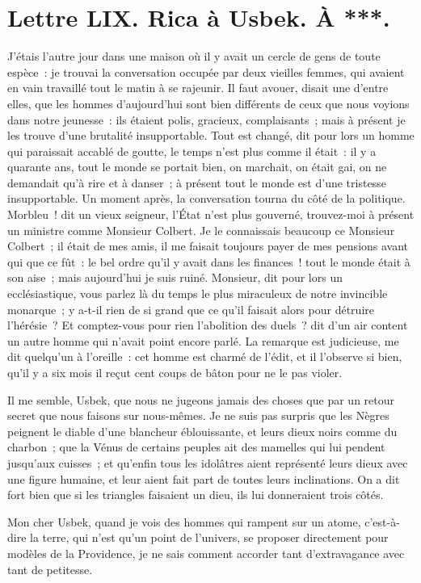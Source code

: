 \documentclass[french,twoside]{book} %
\newcommand{\dateline}[1]{\medskip{\RaggedLeft{#1}\par}\bigskip}
\begin{document}
\dateline{De Paris, le 10 de la lune de Saphar, 1714.}
\section[{Lettre LIX. Rica à Usbek. À ***.}]{Lettre LIX. Rica à Usbek. À ***.}\renewcommand{\leftmark}{Lettre LIX. Rica à Usbek. À ***.}

\noindent J’étais l’autre jour dans une maison où il y avait un cercle de gens de toute espèce : je trouvai la conversation occupée par deux vieilles femmes, qui avaient en vain travaillé tout le matin à se rajeunir. Il faut avouer, disait une d’entre elles, que les hommes d’aujourd’hui sont bien différents de ceux que nous voyions dans notre jeunesse : ils étaient polis, gracieux, complaisants ; mais à présent je les trouve d’une brutalité insupportable. Tout est changé, dit pour lors un homme qui paraissait accablé de goutte, le temps n’est plus comme il était : il y a quarante ans, tout le monde se portait bien, on marchait, on était gai, on ne demandait qu’à rire et à danser ; à présent tout le monde est d’une tristesse insupportable. Un moment après, la conversation tourna du côté de la politique. Morbleu ! dit un vieux seigneur, l’État n’est plus gouverné, trouvez-moi à présent un ministre comme Monsieur Colbert. Je le connaissais beaucoup ce Monsieur Colbert ; il était de mes amis, il me faisait toujours payer de mes pensions avant qui que ce fût : le bel ordre qu’il y avait dans les finances ! tout le monde était à son aise ; mais aujourd’hui je suis ruiné. Monsieur, dit pour lors un ecclésiastique, vous parlez là du temps le plus miraculeux de notre invincible monarque ; y a-t-il rien de si grand que ce qu’il faisait alors pour détruire l’hérésie ? Et comptez-vous pour rien l’abolition des duels ? dit d’un air content un autre homme qui n’avait point encore parlé. La remarque est judicieuse, me dit quelqu’un à l’oreille : cet homme est charmé de l’édit, et il l’observe si bien, qu’il y a six mois il reçut cent coups de bâton pour ne le pas violer.\par
Il me semble, Usbek, que nous ne jugeons jamais des choses que par un retour secret que nous faisons sur nous-mêmes. Je ne suis pas surpris que les Nègres peignent le diable d’une blancheur éblouissante, et leurs dieux noirs comme du charbon ; que la Vénus de certains peuples ait des mamelles qui lui pendent jusqu’aux cuisses ; et qu’enfin tous les idolâtres aient représenté leurs dieux avec une figure humaine, et leur aient fait part de toutes leurs inclinations. On a dit fort bien que si les triangles faisaient un dieu, ils lui donneraient trois côtés.\par
Mon cher Usbek, quand je vois des hommes qui rampent sur un atome, c’est-à-dire la terre, qui n’est qu’un point de l’univers, se proposer directement pour modèles de la Providence, je ne sais comment accorder tant d’extravagance avec tant de petitesse.\par
\end{document}
